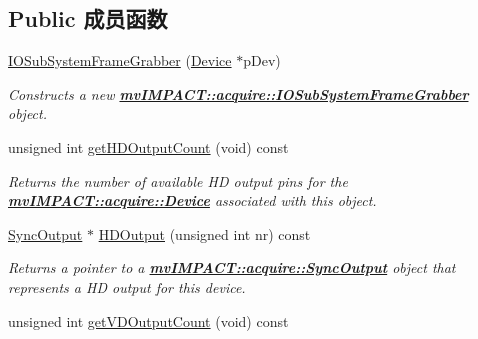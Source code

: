 \subsection*{Public 成员函数}
\begin{DoxyCompactItemize}
\item 
\hyperlink{classmv_i_m_p_a_c_t_1_1acquire_1_1_i_o_sub_system_frame_grabber_a9a02c6ab9fa2ec7a170514dd9ac89002}{I\+O\+Sub\+System\+Frame\+Grabber} (\hyperlink{classmv_i_m_p_a_c_t_1_1acquire_1_1_device}{Device} $\ast$p\+Dev)
\begin{DoxyCompactList}\small\item\em Constructs a new {\bfseries \hyperlink{classmv_i_m_p_a_c_t_1_1acquire_1_1_i_o_sub_system_frame_grabber}{mv\+I\+M\+P\+A\+C\+T\+::acquire\+::\+I\+O\+Sub\+System\+Frame\+Grabber}} object. \end{DoxyCompactList}\item 
\hypertarget{classmv_i_m_p_a_c_t_1_1acquire_1_1_i_o_sub_system_frame_grabber_af693c1061444f7a44c86ebb8f518949b}{unsigned int \hyperlink{classmv_i_m_p_a_c_t_1_1acquire_1_1_i_o_sub_system_frame_grabber_af693c1061444f7a44c86ebb8f518949b}{get\+H\+D\+Output\+Count} (void) const }\label{classmv_i_m_p_a_c_t_1_1acquire_1_1_i_o_sub_system_frame_grabber_af693c1061444f7a44c86ebb8f518949b}

\begin{DoxyCompactList}\small\item\em Returns the number of available H\+D output pins for the {\bfseries \hyperlink{classmv_i_m_p_a_c_t_1_1acquire_1_1_device}{mv\+I\+M\+P\+A\+C\+T\+::acquire\+::\+Device}} associated with this object. \end{DoxyCompactList}\item 
\hyperlink{classmv_i_m_p_a_c_t_1_1acquire_1_1_sync_output}{Sync\+Output} $\ast$ \hyperlink{classmv_i_m_p_a_c_t_1_1acquire_1_1_i_o_sub_system_frame_grabber_a281e839ea8d063a199c09ca51641eeaf}{H\+D\+Output} (unsigned int nr) const 
\begin{DoxyCompactList}\small\item\em Returns a pointer to a {\bfseries \hyperlink{classmv_i_m_p_a_c_t_1_1acquire_1_1_sync_output}{mv\+I\+M\+P\+A\+C\+T\+::acquire\+::\+Sync\+Output}} object that represents a H\+D output for this device. \end{DoxyCompactList}\item 
\hypertarget{classmv_i_m_p_a_c_t_1_1acquire_1_1_i_o_sub_system_frame_grabber_ac04032b336c489792fb1cc669bac3c27}{unsigned int \hyperlink{classmv_i_m_p_a_c_t_1_1acquire_1_1_i_o_sub_system_frame_grabber_ac04032b336c489792fb1cc669bac3c27}{get\+V\+D\+Output\+Count} (void) const }\label{classmv_i_m_p_a_c_t_1_1acquire_1_1_i_o_sub_system_frame_grabber_ac04032b336c489792fb1cc669bac3c27}


\end{DoxyCompactItemize}
